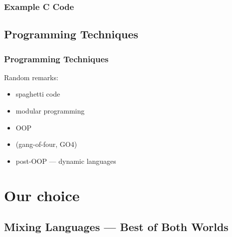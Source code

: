 \documentclass[10pt,t]{beamer}
\newcommand{\dgreen}[1]{{\color{dgreen}{#1}}}
\begin{document}
\begin{frame}
  \frametitle{Example C Code}

  \verbexamples
\end{frame}



\subsection{Programming Techniques}

\begin{frame}
  \frametitle{Programming Techniques}
  Random remarks:
  \begin{itemize}
  \item spaghetti code
  \item modular programming
  \item OOP
  \item \dgreen{design patterns} (gang-of-four, GO4)
  \item post-OOP --- dynamic languages
  \end{itemize}
  \begin{center}
  \end{center}
\end{frame}

\section{Our choice}

\subsection{Mixing Languages --- Best of Both Worlds}
\end{document}
